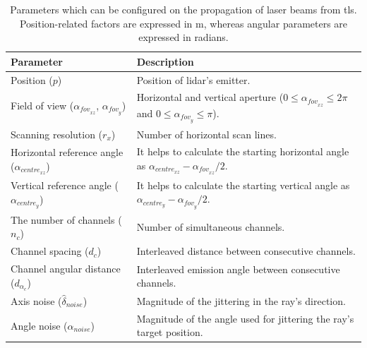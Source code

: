 \renewcommand{\arraystretch}{1.2}
\begin{table}
    \small
    \centering
    \caption{Parameters which can be configured on the propagation of laser beams from \acrshort{tls}. Position-related factors are expressed in \si{\meter}, whereas angular parameters are expressed in radians.}
    \label{table:tls_parameters}
    \begin{tabular}{ll}
    \toprule
    \textbf{Parameter} & \textbf{Description} \\
    \midrule
    Position ($p$) & Position of \acrshort{lidar}'s emitter.\\
    Field of view ($\alpha_{\textit{fov}_{xz}}$, $\alpha_{\textit{fov}_{y}}$) & Horizontal and vertical aperture ($0 \leq \alpha_{\textit{fov}_{xz}} \leq 2\pi$ and $0 \leq \alpha_{\textit{fov}_{y}} \leq \pi$). \\
    Scanning resolution ($r_{x}$) & Number of horizontal scan lines. \\
    Horizontal reference angle ($\alpha_{\textit{centre}_{xz}}$) & It helps to calculate the starting horizontal angle as $\alpha_{\textit{centre}_{xz}} - \alpha_{\textit{fov}_{xz}} / 2$. \\
    Vertical reference angle ($\alpha_{\textit{centre}_{y}}$) & It helps to calculate the starting vertical angle as $\alpha_{\textit{centre}_{y}} - \alpha_{\textit{fov}_{y}} / 2$. \\
    The number of channels ($n_{c}$) & Number of simultaneous channels. \\
    Channel spacing ($d_{c}$) & Interleaved distance between consecutive channels.\\
    Channel angular distance ($d_{\alpha_{c}}$) & Interleaved emission angle between consecutive channels.\\
    Axis noise ($\hat{\delta}_{\textit{noise}}$) & Magnitude of the jittering in the ray's direction. \\
    Angle noise ($\alpha_{\textit{noise}}$) & Magnitude of the angle used for jittering the ray's target position. \\
    \bottomrule
    \end{tabular}
    \libertineNormal
\end{table}
\renewcommand{\arraystretch}{1}

